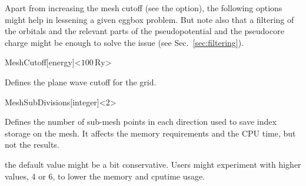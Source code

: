 Apart from increasing the mesh cutoff (see the  option),
the following options might help in lessening a given eggbox problem. But
note also that a filtering of the orbitals and the relevant parts of
the pseudopotential and the pseudocore charge might be enough to solve
the issue (see Sec.~\ref{sec:filtering}).

\begin{fdfentry}{MeshCutoff}[energy]<$100\,\mathrm{Ry}$>

  Defines the plane wave cutoff for the grid.
  
 
\end{fdfentry}

\begin{fdfentry}{MeshSubDivisions}[integer]<$2$>
  
  Defines the number of sub-mesh points in each direction used
  to save index storage on the mesh. It affects the memory
  requirements and the CPU time, but not the results. 

  \note the default value might be a bit conservative. Users might
  experiment with higher values, 4 or 6, to lower the memory and
  cputime usage.

\end{fdfentry}


